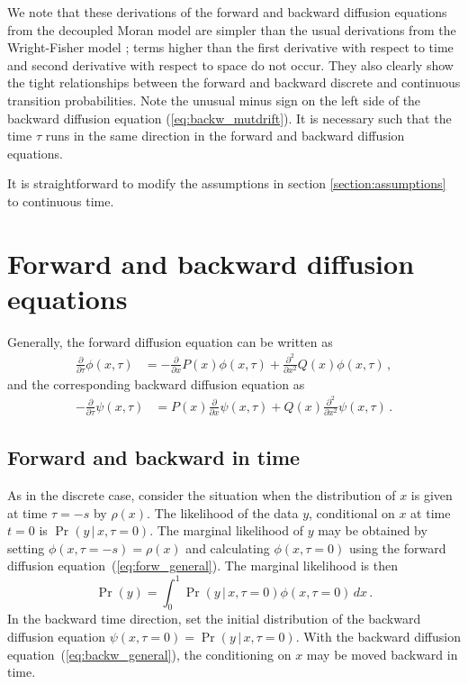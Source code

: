 \documentclass[preprint]{elsarticle}
\newcommand\given{{\,|\,}}
\newcommand\s{\ensuremath{s}}
\begin{document}
We note that these derivations of the forward and backward diffusion equations from the decoupled Moran model are simpler than the usual derivations from the Wright-Fisher model \citep{Ewen04}; terms higher than the first derivative with respect to time and second derivative with respect to space do not occur. They also clearly show the tight relationships between the forward and backward discrete and continuous transition probabilities. Note the unusual minus sign on the left side of the backward diffusion equation (\ref{eq:backw_mutdrift}). It is necessary such that the time $\tau$ runs in the same direction in the forward and backward diffusion equations.


It is straightforward to modify the assumptions in section \ref{section:assumptions} to continuous time.

\section{Forward and backward diffusion equations}

Generally, the forward diffusion equation can be written as
\begin{equation}\label{eq:forw_general}
\begin{split}
\frac{\partial}{\partial \tau}\phi(x,\tau)&=-\frac{\partial}{\partial x} P(x)\phi(x,\tau)+\frac{\partial^2}{\partial x^2} Q(x) \phi(x,\tau)\,,
\end{split}
\end{equation}
and the corresponding backward diffusion equation as
\begin{equation}\label{eq:backw_general}
\begin{split}
-\frac{\partial}{\partial \tau}\psi(x,\tau)&=P(x)\frac{\partial}{\partial x} \psi(x,\tau)+Q(x)\frac{\partial^2}{\partial x^2} \psi(x,\tau)\,.
\end{split}
\end{equation}

\subsection{Forward and backward in time}

As in the discrete case, consider the situation when the distribution of $x$ is given at time $\tau=-\s$ by $\rho(x)$. The likelihood of the data $y$, conditional on $x$ at time $t=0$ is $\Pr(y\given x,\tau=0)$. The marginal likelihood of $y$ may be obtained by setting $\phi(x,\tau=-\s)=\rho(x)$ and calculating $\phi(x,\tau=0)$ using the forward diffusion equation~(\ref{eq:forw_general}). The marginal likelihood is then
\begin{equation}\label{eq:marg_like2}
\Pr(y)= \int_{0}^{1} \Pr(y\given x,\tau=0)\phi(x,\tau=0) \,dx\,.
\end{equation}
In the backward time direction, set the initial distribution of the backward diffusion equation  $\psi(x,\tau=0)=\Pr(y\given x,\tau=0)$. With the backward diffusion equation~(\ref{eq:backw_general}), the conditioning on $x$ may be moved backward in time. 
\end{document}
